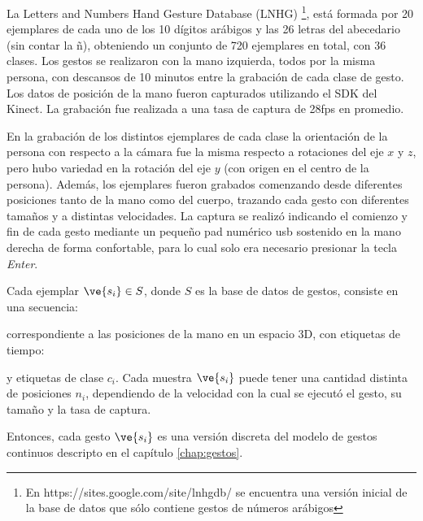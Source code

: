 
La Letters and Numbers Hand Gesture Database (LNHG) \footnote{En https://sites.google.com/site/lnhgdb/ se encuentra una versión inicial de la base de datos que sólo contiene gestos de números arábigos}, está formada por 20 ejemplares de cada uno de los 10 dígitos arábigos y las 26 letras del abecedario (sin contar la ñ), obteniendo un conjunto de 720 ejemplares en total, con 36 clases. Los gestos se realizaron con la mano izquierda, todos por la misma persona, con descansos de 10 minutos entre la grabación de cada clase de gesto. Los datos de posición de la mano fueron capturados utilizando el SDK del Kinect. La grabación fue realizada a una tasa de captura de 28fps en promedio. 



En la grabación de los distintos ejemplares de cada clase la orientación de la persona con respecto a la cámara fue la misma respecto a rotaciones del eje $x$ y $z$, pero hubo variedad en la rotación del eje $y$ (con origen en el centro de la persona). Además, los ejemplares fueron grabados comenzando desde diferentes posiciones tanto de la mano como del cuerpo, trazando cada gesto con diferentes tamaños y a distintas velocidades. La captura se realizó indicando el comienzo y fin de cada gesto mediante un pequeño pad numérico usb sostenido en la mano derecha de forma confortable, para lo cual solo era necesario presionar la tecla \textit{Enter}.

Cada ejemplar $\ve{s_i} \in S$, donde $S$ es la base de datos de gestos, consiste en una secuencia:


correspondiente a las posiciones de la mano en un espacio 3D, con etiquetas de tiempo:


y etiquetas de clase $c_i$. Cada muestra $\ve{s_i}$ puede tener una cantidad distinta de posiciones $n_i$, dependiendo de la velocidad con la cual se ejecutó el gesto, su tamaño y la tasa de captura.

Entonces, cada gesto $\ve{s_i}$ es una versión discreta del modelo de gestos continuos descripto en el capítulo \ref{chap:gestos}.

